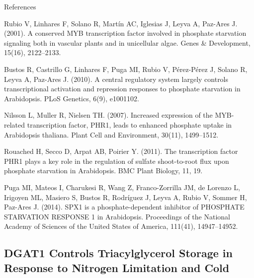\documentclass[10pt,letterpaper]{article}
\begin{document}
References

Rubio V, Linhares F, Solano R, Martín AC, Iglesias J, Leyva A, Paz-Ares J. (2001). A conserved MYB transcription factor involved in phosphate starvation signaling both in vascular plants and in unicellular algae. Genes & Development, 15(16), 2122–2133.

Bustos R, Castrillo G, Linhares F, Puga MI, Rubio V, Pérez-Pérez J, Solano R, Leyva A, Paz-Ares J. (2010). A central regulatory system largely controls transcriptional activation and repression responses to phosphate starvation in Arabidopsis. PLoS Genetics, 6(9), e1001102.

Nilsson L, Muller R, Nielsen TH. (2007). Increased expression of the MYB-related transcription factor, PHR1, leads to enhanced phosphate uptake in Arabidopsis thaliana. Plant Cell and Environment, 30(11), 1499–1512.

Rouached H, Secco D, Arpat AB, Poirier Y. (2011). The transcription factor PHR1 plays a key role in the regulation of sulfate shoot-to-root flux upon phosphate starvation in Arabidopsis. BMC Plant Biology, 11, 19.

Puga MI, Mateos I, Charukesi R, Wang Z, Franco-Zorrilla JM, de Lorenzo L, Irigoyen ML, Masiero S, Bustos R, Rodríguez J, Leyva A, Rubio V, Sommer H, Paz-Ares J. (2014). SPX1 is a phosphate-dependent inhibitor of PHOSPHATE STARVATION RESPONSE 1 in Arabidopsis. Proceedings of the National Academy of Sciences of the United States of America, 111(41), 14947–14952.



\subsection*{DGAT1 Controls Triacylglycerol Storage in Response to Nitrogen Limitation and Cold}
\end{document}
